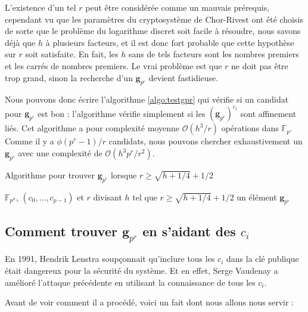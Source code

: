 \documentclass[a4paper, titlepage, 11pt]{article}
\theoremstyle{definition}
\theoremstyle{remark}
\def\O{\mathcal O}
\def\gf #1{\mathbb{F}_{#1}}
\def\mbf #1{\mathbf{#1}}
\begin{document}
L'existence d'un tel $r$ peut être considérée comme un mauvais prérequis, cependant vu que les paramètres du cryptosystème de Chor-Rivest ont été choisis de sorte que le problème du logarithme discret soit facile à résoudre, nous savons déjà que $h$ à plusieurs facteurs, et il est donc fort probable que cette hypothèse sur $r$ soit satisfaite. En fait, les $h$ sans de tels facteurs sont les nombres premiers et les carrés de nombres premiers. Le vrai problème est que $r$ ne doit pas être trop grand, sinon la recherche d'un $\mbf g_{p^r}$  devient fastidieuse.

Nous pouvons donc écrire l'algorithme \ref{algo:testgpr} qui vérifie si un candidat pour $\mbf g_{p^r}$ est bon : l'algorithme vérifie simplement si les $(\mbf g_{p^r})^{c_i}$ sont affinement liés. Cet algorithme a pour complexité moyenne $\O(h^3/r)$ opérations dans $\gf{p}$. Comme il y a $\phi(p^r-1)/r$ candidats, nous pouvons chercher exhaustivement un $\mbf g_{p^r}$ avec une complexité de $\O(h^3p^r/r^2)$.

\begin{algorithm}[h]
\caption{Algorithme pour trouver $\mbf g_{p^r}$ lorsque $r\geqslant \sqrt{h + 1/4} + 1/2$}
\label{algo:testgpr}
\begin{algorithmic}[1]
\REQUIRE $\gf{p^h}$, $(c_0,\dots, c_{p-1})$ et $r$ divisant $h$ tel que $r\geqslant \sqrt{h + 1/4} + 1/2$
\ENSURE un élément $\mbf g_{p^r}$
\FORALL{$\zeta \in \gf{p^h}$ générateur de $\gf{p^r}^\times$} \label{boucle:algoTestgpr}
		\ENDIF
	\ENDFOR
	\RETURN{$\zeta$}
\ENDFOR
\end{algorithmic}
\end{algorithm}

\subsection{Comment trouver $\mbf g_{p^r}$ en s'aidant des $c_i$}

En 1991, Hendrik Lenstra \cite{lenstra1991} soupçonnait qu'inclure tous les $c_i$ dans la clé publique était dangereux pour la sécurité du système. Et en effet, Serge Vaudenay a amélioré l'attaque précédente en utilisant la connaissance de tous les $c_i$.

Avant de voir comment il a procédé, voici un fait dont nous allons nous servir :
\end{document}
